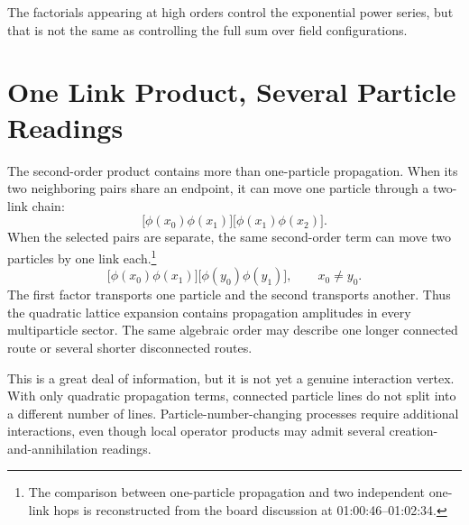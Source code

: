The factorials appearing at high orders control the exponential power series, but that is not the same as controlling the full sum over field configurations.

\begin{classroomqa}
\end{classroomqa}

\section{One Link Product, Several Particle Readings}

The second-order product contains more than one-particle propagation. When its two neighboring pairs share an endpoint, it can move one particle through a two-link chain:
\begin{equation}
\bigl[\phi(x_0)\phi(x_1)\bigr]
\bigl[\phi(x_1)\phi(x_2)\bigr].
\end{equation}
When the selected pairs are separate, the same second-order term can move two particles by one link each.\footnote{The comparison between one-particle propagation and two independent one-link hops is reconstructed from the board discussion at 01:00:46--01:02:34.}
\begin{equation}
\bigl[\phi(x_0)\phi(x_1)\bigr]
\bigl[\phi(y_0)\phi(y_1)\bigr],
\qquad x_0\neq y_0.
\end{equation}
The first factor transports one particle and the second transports another. Thus the quadratic lattice expansion contains propagation amplitudes in every multiparticle sector. The same algebraic order may describe one longer connected route or several shorter disconnected routes.

This is a great deal of information, but it is not yet a genuine interaction vertex. With only quadratic propagation terms, connected particle lines do not split into a different number of lines. Particle-number-changing processes require additional interactions, even though local operator products may admit several creation-and-annihilation readings.

